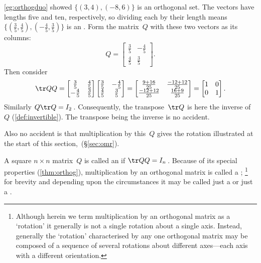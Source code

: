 \begin{example} \label{eg:}
\autoref{eg:orthogduo} showed \(\{(3,4),(-8,6)\}\) is an orthogonal set.  
The vectors have lengths five and ten, respectively, so dividing each by their length means \(\{(\frac35,\frac45),(-\frac45,\frac35)\}\) is an .
Form the matrix~\(Q\) with these two vectors as its columns:
\[Q%
=\begin{bmatrix} \frac35&-\frac45\\\frac45&\frac35 \end{bmatrix}.\]
Then consider
\begin{equation*}
\tr QQ=\begin{bmatrix} \frac35&\frac45\\-\frac45&\frac35 \end{bmatrix}
\begin{bmatrix} \frac35&-\frac45\\\frac45&\frac35 \end{bmatrix}
=\begin{bmatrix} \frac{9+16}{25}&\frac{-12+12}{25}\\
\frac{-12+12}{25}&\frac{16+9}{25} \end{bmatrix}
=\begin{bmatrix} 1&0\\0&1 \end{bmatrix}.
\end{equation*}
Similarly \(Q\tr Q=I_2\)\,.
Consequently, the transpose~\(\tr Q\) is here the inverse of~\(Q\) (\autoref{def:invertible}).  
The transpose being the inverse is no accident.

Also no accident is that multiplication by this~\(Q\) gives the rotation illustrated at the start of this section,~(\S\ref{sec:omr}).
\end{example}




\begin{comment}
Could change this definition to $Q$~is {invertible} and $Q^{-1}=\tr Q$.  Then prove equivalence.  Use this for now.
\end{comment}

\begin{definition} \label{def:orthog} 
A square \(n\times n\) matrix~\(Q\) is called an  if \(\tr QQ=I_n\)\,.
Because of its special properties (\autoref{thm:orthog}),
multiplication by an orthogonal matrix is called a ;  
\footnote{Although herein we term multiplication by an orthogonal matrix as a `rotation' it generally is not a single rotation about a single axis.  
Instead, generally the `rotation' characterised by any one orthogonal matrix may be composed of a sequence of several rotations about different axes---each axis with a different orientation.}
for brevity and depending upon the circumstances it may be called just a  or just a .
\end{definition}





